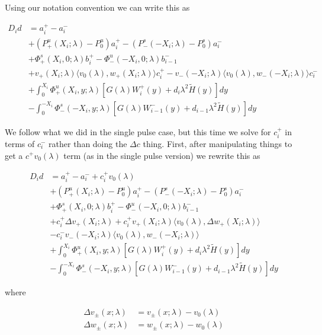 \documentclass[12pt]{article}
\begin{document}
\begin{enumerate}
Using our notation convention we can write this as


\begin{align*}
D_i d &= a_i^+ - a_i^- \\
&+ (P^u_+(X_i; \lambda) - P_0^u)a_i^+ - (P^s_-(-X_i; \lambda) - P_0^s)a_i^- \\
&+ \Phi^s_+(X_i, 0; \lambda)b_i^+ - \Phi^u_-(-X_i, 0; \lambda)b_{i-1}^- \\
&+ v_+(X_i; \lambda) \langle v_0(\lambda), w_+(X_i; \lambda) \rangle c_i^+ - v_-(-X_i; \lambda) \langle v_0(\lambda), w_-(-X_i; \lambda) \rangle c_i^- \\
&+ \int_0^{X_i} \Phi^u_+(X_i, y; \lambda) [ G(\lambda)W_i^+(y) + d_i \lambda^2 \tilde{H}(y) ] dy \\
&- \int_0^{-X_i} \Phi^s_-(-X_i, y; \lambda) [ G(\lambda)W_{i-1}^-(y) + d_{i-1} \lambda^2 \tilde{H}(y) ] dy
\end{align*}

We follow what we did in the single pulse case, but this time we solve for $c_i^+$ in terms of $c_i^-$ rather than doing the $\Delta c$ thing. First, after manipulating things to get a $c^+ v_0(\lambda)$ term (as in the single pulse version) we rewrite this as

\begin{align*}
D_i d &= a_i^+ - a_i^- + c_i^+ v_0(\lambda) \\
&+ (P^u_+(X_i; \lambda) - P_0^u)a_i^+ - (P^s_-(-X_i; \lambda) - P_0^s)a_i^- \\
&+ \Phi^s_+(X_i, 0; \lambda)b_i^+ - \Phi^u_-(-X_i, 0; \lambda)b_{i-1}^- \\
&+ c_i^+ \Delta v_+(X_i; \lambda) + c_i^+ v_+(X_i; \lambda) \langle v_0(\lambda), \Delta w_+(X_i; \lambda) \rangle \\
&- c_i^- v_-(-X_i; \lambda) \langle v_0(\lambda), w_-(-X_i; \lambda) \rangle \\
&+ \int_0^{X_i} \Phi^u_+(X_i, y; \lambda) [ G(\lambda)W_i^+(y) + d_i \lambda^2 \tilde{H}(y) ] dy \\
&- \int_0^{-X_i} \Phi^s_-(-X_i, y; \lambda) [ G(\lambda)W_{i-1}^-(y) + d_{i-1} \lambda^2 \tilde{H}(y) ] dy
\end{align*}

where

\begin{align*}
\Delta v_\pm(x; \lambda) &= v_\pm(x; \lambda) - v_0(\lambda) \\
\Delta w_\pm(x; \lambda) &= w_\pm(x; \lambda) - w_0(\lambda)
\end{align*}


\end{enumerate}
\end{document}

